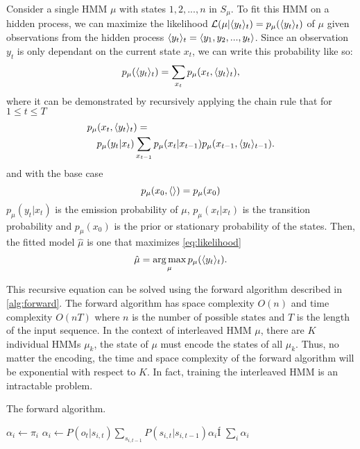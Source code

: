 Consider a single HMM \(\mu\) with states \(1, 2, ...,n\) in \(S_\mu\). To fit this HMM on a hidden process, we can maximize the likelihood \(\mathcal{L}(\mu | \langle y_t\rangle_t) = p_\mu(\langle y_t\rangle_t)\) of \(\mu\) given observations from the hidden process \(\langle y_t\rangle_t = \langle y_1, y_2, ..., y_t\rangle\). Since an observation \(y_t\) is only dependant on the current state \(x_t\), we can write this probability like so:
\begin{equation}\label{eq:likelihood}
    p_\mu(\langle y_t\rangle_t) = \sum_{x_t} p_\mu(x_t, \langle y_t\rangle_t),
\end{equation}
where it can be demonstrated by recursively applying the chain rule that for \(1
\leq t \leq T\)
\begin{equation}
    \begin{multlined}
        p_\mu(x_t, \seq{y_t}_t) = \\
        p_\mu(y_t|x_t) \sum_{x_{t-1}} p_\mu(x_t|x_{t-1}) p_\mu(x_{t-1}, \seq{y_t}_{t-1}).
    \end{multlined}
\end{equation}
and with the base case
\begin{equation}\label{eq:max_likelihood}
    p_\mu(x_0, \langle\rangle) = p_\mu(x_0)
\end{equation}
\(p_\mu(y_t|x_t)\) is the emission probability of \(\mu\), \(p_\mu(x_t | x_t)\) is the transition probability and \(p_\mu(x_0)\) is the prior or stationary probability of the states. Then, the fitted model \(\hat{\mu}\) is one that maximizes \cref{eq:likelihood}
\begin{equation}
    \label{eq:argmax_observation}
    \hat{\mu} = \operatorname*{arg\,max}_{\mu} p_\mu(\langle y_t\rangle_t).
\end{equation}

This recursive equation can be solved using the forward algorithm described in \cref{alg:forward}. The forward algorithm has space complexity \(O(n)\)  and time complexity \(O(nT)\) where \(n\) is the number of possible states and \(T\) is the length of the input sequence. In the context of interleaved HMM \(\mu\), there are \(K\) individual HMMs \(\mu_k\), the state of \(\mu\) must encode the states of all \(\mu_k\). Thus, no matter the encoding, the time and space complexity of the forward algorithm will be exponential with respect to \(K\). In fact, training the interleaved HMM is an intractable problem\cite{Landwehr2008-vw}.
\begin{algorithm}[H]
    \caption{The forward algorithm.}\label{alg:forward}
    \begin{algorithmic}[1]
        \State $\alpha_i \gets \pi_i$
        \EndFor
        \State $\alpha_i \gets P(o_t|s_{i,t}) \sum_{s_{i, t-1}} P(s_{i, t} | s_{i, t-1}) \alpha_i$Í
        \EndFor
        \EndFor
        \State \Return $\sum_{i} \alpha_i$
        \EndFunction
    \end{algorithmic}
\end{algorithm}

